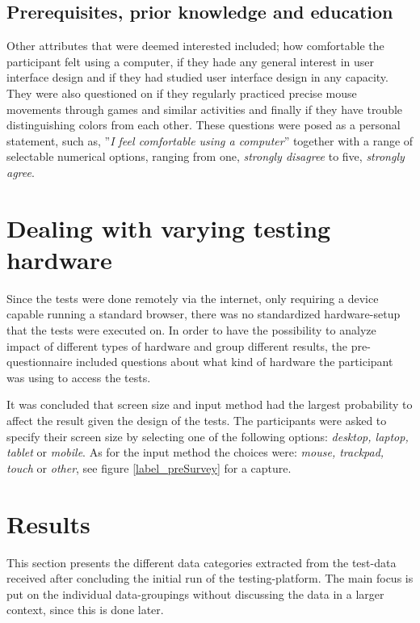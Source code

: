   \subsection{Prerequisites, prior knowledge and education}

  Other attributes that were deemed interested included; how comfortable
  the participant felt using a computer, if they hade any general interest
  in user interface design and if they had studied user interface design in
  any capacity. They were also questioned on if they regularly practiced
  precise mouse movements through games and similar activities and finally
  if they have trouble distinguishing colors from each other. These
  questions were posed as a personal statement, such as, ''\textit{I feel
    comfortable using a computer}'' together with a range of selectable
  numerical options, ranging from one, \textit{strongly disagree} to five,
  \textit{strongly agree}.

\section{Dealing with varying testing hardware}\label{label_testingHardware}

  Since the tests were done remotely via the internet, only requiring a
  device capable running a standard browser, there was no standardized
  hardware-setup that the tests were executed on. In order to have the
  possibility to analyze impact of different types of hardware and group
  different results, the pre-questionnaire included questions about what
  kind of hardware the participant was using to access the tests.

  It was concluded that screen size and input method had the largest
  probability to affect the result given the design of the tests.
  The participants were asked to specify their screen size by selecting one
  of the following options: \textit{desktop, laptop, tablet} or
  \textit{mobile}. As for the input method the choices were:
  \textit{mouse, trackpad, touch} or \textit{other}, see figure
  \ref{label_preSurvey} for a capture.

\newpage
\section{Results}

  This section presents the different data categories extracted from the
  test-data received after concluding the initial run of the testing-platform.
  The main focus is put on the individual data-groupings without discussing the
  data in a larger context, since this is done later.

